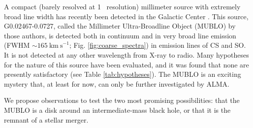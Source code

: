 \documentclass[12pt,a4paper]{article}  %
\newcommand{\kms}{\ensuremath{\mathrm{km~s}^{-1}}\xspace}
\begin{document}
%
A compact (barely resolved at 1\arcsec~ resolution) millimeter source with extremely broad line width has recently been detected in the Galactic Center \citep{Ginsburg2024}.
This source, G0.02467-0.0727, called the Millimeter Ultra-Broadline Object (MUBLO) by those authors, is detected both in continuum and in very broad line emission (FWHM $\sim165~\kms$; Fig. \ref{fig:coarse_spectra}) in emission lines of CS and SO.
It is not detected at any other wavelength from X-ray to radio.
Many hypotheses for the nature of this source have been evaluated, and it was found that none are presently satisfactory (see Table \ref{tab:hypotheses}).
The MUBLO is an exciting mystery that, at least for now, can only be further investigated by ALMA.

\begin{tcolorbox}
\noindent 
We propose observations to test the two most promising possibilities: that the MUBLO is a disk around an intermediate-mass black hole, or that it is the remnant of a stellar merger.
\end{tcolorbox}
\end{document}
